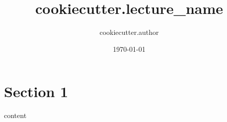 \documentclass[columns = 3, fontsize = 12pt]{sheet}
\title{ {{cookiecutter.lecture_name}} }
\author{ {{cookiecutter.author}} }
\date{\today}
\begin{document}
\section{Section 1}
\begin{sectionbox}
	content
\end{sectionbox}
\end{document}
